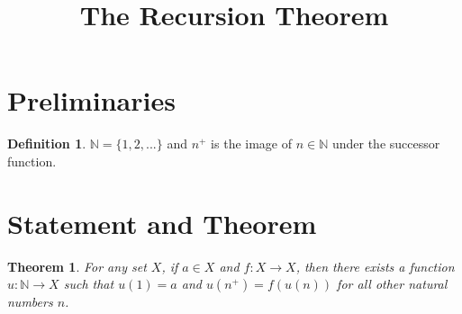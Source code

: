 \documentclass{article}
\title{The Recursion Theorem}
\theoremstyle{definition}
\newtheorem{definition}{Definition}[section]
\theoremstyle{definition}
\theoremstyle{plain}
\theoremstyle{remark}
\theoremstyle{plain}
\newtheorem{theorem}{Theorem}[section]
\theoremstyle{remark}
\theoremstyle{plain}
\theoremstyle{plain}
\theoremstyle{plain}
\begin{document}
\maketitle

\section{Preliminaries}

\begin{definition}
  \( \mathbb{N} = \{1, 2, ... \} \) and \( n^{+} \) is the image of \( n \in \mathbb{N} \) under the successor function.
\end{definition}

\section{Statement and Theorem}

\begin{theorem}
  For any set \( X \), if \( a \in X \) and \( f : X \rightarrow X \), then there exists a function \( u: \mathbb{N} \rightarrow X \) such 
  that \( u(1) = a \) and \( u(n^{+}) = f(u(n)) \) for all other natural numbers \( n \). 
  \label{recursion}
\end{theorem}
\end{document}
